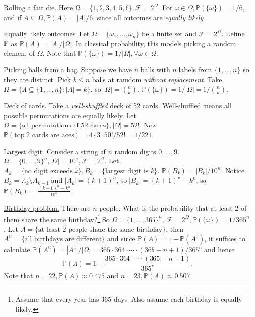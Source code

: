 \begin{example}
    \underline{Rolling a fair die.} Here $ \Omega = \{1,2,3,4,5,6\}, \mathcal{F} = 2^\Omega $. For $ \omega\in \Omega, \mathbb{P}(\{\omega\})=1/6 $, and if $ A \subseteq \Omega, \mathbb{P}(A)=|A|/6 $, since all outcomes are \textit{equally likely}.
\end{example}
\begin{example}
    \underline{Equally likely outcomes.} Let $ \Omega = \{\omega_1,\dots, \omega_n\} $ be a finite set and $ \mathcal{F}=2^\Omega $. Define ${\mathbb{P}}$ as $ \mathbb{P}(A)=|A|/|\Omega| $. In classical probability, this models picking a random element of $ \Omega $. Note that $ \mathbb{P}(\{\omega\})=1/|\Omega|, \forall \omega\in \Omega $.
\end{example}
\begin{example}
    \underline{Picking balls from a bag.} Suppose we have $n$ balls with $n$ labels from $ \{1,\dots,n\} $ so they are distinct. Pick $k\le n$ balls at ramdom \textit{without replacement}. Take $ \Omega = \{A \subseteq \{1,\dots,n\}: |A|=k\} $, so $ |\Omega|=\binom{n}{k} $. $ \mathbb{P}(\{\omega\}) = 1/|\Omega| = 1/\binom{n}{k} $.
\end{example}
\begin{example}
    \underline{Deck of cards.} Take a \textit{well-shuffled} deck of 52 cards. Well-shuffled means all possible permutations are equally likely. Let $ \Omega = \{\text{all permutations of 52 cards}\}, |\Omega|=52! $. Now $ \mathbb{P}(\text{top 2 cards are aces}) = 4 \cdot 3 \cdot 50!/52! = 1/221$.
\end{example}
\begin{example}
    \underline{Largest digit.} Consider a string of $n$ random digits $ 0,\dots,9 $. $ \Omega = \{0,\dots,9\}^n, |\Omega| = 10^n, \mathcal{F}=2^\Omega $. Let $ A_k = \{\text{no digit exceeds }k\}, B_k =\{\text{largest digit is }k\} $. $ \mathbb{P}(B_k) = |B_k|/10^n $. Notice $ B_k = A_k \setminus A_{k-1} $ and $ |A_k| = (k+1)^n $, so $ |B_k|=(k+1)^n-k^n $, so $ \mathbb{P}(B_k) = \frac{(k+1)^n-k^n}{10^n} $.
\end{example}
\begin{example}
    \underline{Birthday problem.} There are $n$ people. What is the probability that at least 2 of them share the same birthday?\footnote{Assume that every year has 365 days. Also assume each birthday is equally likely.} So $ \Omega = \{1,\dots,365\}^n $, $ \mathcal{F} = 2^\Omega, \mathbb{P}(\{\omega\}) = 1/365^n $. Let $ A=\{\text{at least 2 people share the same birthday}\} $, then $ A^\complement = \{\text{all birthdays are different}\} $ and since $ \mathbb{P}(A)=1-\mathbb{P}(A^\complement) $, it suffices to calculate $ \mathbb{P}(A^\complement) = |A^\complement|/|\Omega| = 365 \cdot 364 \cdot \cdots \cdot (365-n+1)/365^n $ and hence 
    \[
        \mathbb{P}(A) = 1-\frac{365 \cdot 364 \cdot \cdots \cdot (365-n+1)}{365^n}.
    \]
    Note that $n=22, \mathbb{P}(A) \approx 0.476$ and $ n=23, \mathbb{P}(A)\approx 0.507 $. 
\end{example}

